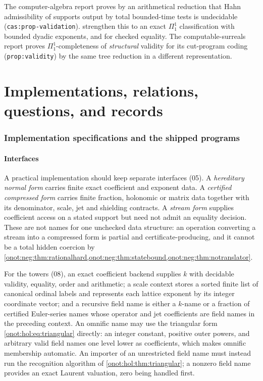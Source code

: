 \documentclass[11pt,oneside]{article}
\numberwithin{equation}{section}
\theoremstyle{definition}
\theoremstyle{remark}
\newcommand{\replabel}[1]{\nolinkurl{#1}}
\begin{document}
The computer-algebra report proves by an arithmetical reduction that Hahn
admissibility of supports output by total bounded-time tests is undecidable
(\replabel{cas:prop-validation}). 
strengthen this to an exact $\Pi^1_1$ classification with bounded dyadic
exponents, and for checked equality. The computable-surreals report proves
$\Pi^1_1$-completeness of \emph{structural} validity for its cut-program coding
(\replabel{prop:validity}) by the same tree reduction in a different
representation.

\part*{Implementations, relations, questions, and records}

\section{Implementation specifications and the shipped programs}\label{onot:sec:implementation}

\subsection{Interfaces}

A practical implementation should keep separate interfaces (05). A
\emph{hereditary normal form} carries finite exact coefficient and exponent data.
A \emph{certified compressed form} carries finite fraction, holonomic or matrix
data together with its denominator, scale, jet and shielding contracts. A
\emph{stream form} supplies coefficient access on a stated support but need not
admit an equality decision. These are not names for one unchecked data structure:
an operation converting a stream into a compressed form is partial and
certificate-producing, and it cannot be a total hidden coercion by
\cref{onot:neg:thm:rationalhard,onot:neg:thm:statebound,onot:neg:thm:notranslator}.

For the towers (08), an exact coefficient backend supplies $k$ with decidable
validity, equality, order and arithmetic; a scale context stores a sorted finite
list of canonical ordinal labels and represents each lattice exponent by its
integer coordinate vector; and a recursive field name is either a $k$-name or a
fraction of certified Euler-series names whose operator and jet coefficients are
field names in the preceding context. An omnific name may use the triangular form
\eqref{onot:hol:eq:triangular} directly: an integer constant, positive outer
powers, and arbitrary valid field names one level lower as coefficients, which
makes omnific membership automatic. An importer of an unrestricted field name
must instead run the recognition algorithm of \cref{onot:hol:thm:triangular}; a
nonzero field name provides an exact Laurent valuation, zero being handled first.
\end{document}

